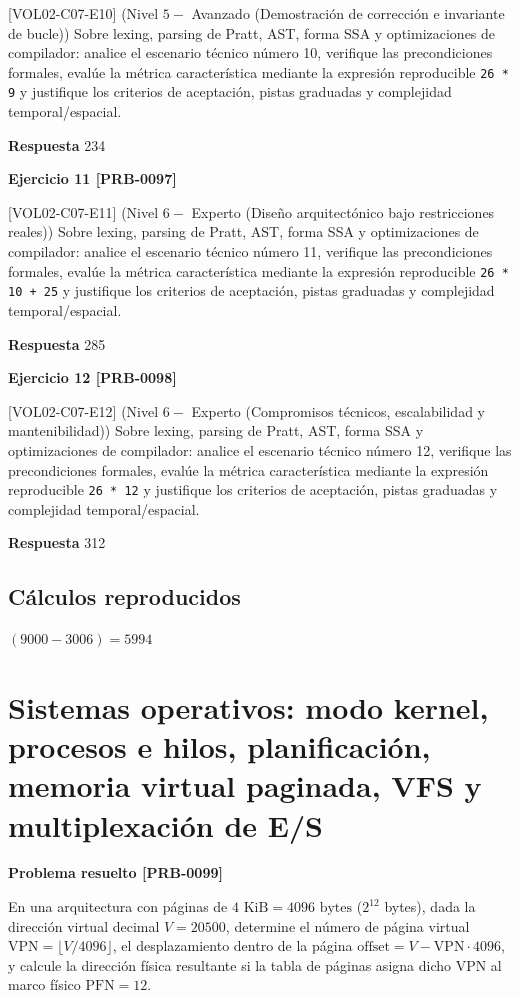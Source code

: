 \documentclass{book}
\begin{document}
[VOL02-C07-E10] (Nivel \(5 -\) Avanzado (Demostración de corrección e invariante de bucle)) Sobre lexing, parsing de Pratt, AST, forma SSA y optimizaciones de compilador: analice el escenario técnico número 10, verifique las precondiciones formales, evalúe la métrica característica mediante la expresión reproducible \texttt{26 * 9} y justifique los criterios de aceptación, pistas graduadas y complejidad temporal/espacial.

\noindent\textbf{Respuesta} 234

\noindent\textbf{Ejercicio 11 [PRB-0097]}

[VOL02-C07-E11] (Nivel \(6 -\) Experto (Diseño arquitectónico bajo restricciones reales)) Sobre lexing, parsing de Pratt, AST, forma SSA y optimizaciones de compilador: analice el escenario técnico número 11, verifique las precondiciones formales, evalúe la métrica característica mediante la expresión reproducible \texttt{26 * 10 + 25} y justifique los criterios de aceptación, pistas graduadas y complejidad temporal/espacial.

\noindent\textbf{Respuesta} 285

\noindent\textbf{Ejercicio 12 [PRB-0098]}

[VOL02-C07-E12] (Nivel \(6 -\) Experto (Compromisos técnicos, escalabilidad y mantenibilidad)) Sobre lexing, parsing de Pratt, AST, forma SSA y optimizaciones de compilador: analice el escenario técnico número 12, verifique las precondiciones formales, evalúe la métrica característica mediante la expresión reproducible \texttt{26 * 12} y justifique los criterios de aceptación, pistas graduadas y complejidad temporal/espacial.

\noindent\textbf{Respuesta} 312

\subsection*{Cálculos reproducidos}

\(\left(9000-3006\right) = 5994\)

\section{Sistemas operativos: modo kernel, procesos e hilos, planificación, memoria virtual paginada, VFS y multiplexación de E/S}

\noindent\textbf{Problema resuelto [PRB-0099]}

En una arquitectura con páginas de \(4\text{ KiB} = 4096\text{ bytes}\) (\(2^{12}\) bytes), dada la dirección virtual decimal \(V = 20500\), determine el número de página virtual \(\text{VPN} = \lfloor V / 4096 \rfloor\), el desplazamiento dentro de la página \(\text{offset} = V - \text{VPN} \cdot 4096\), y calcule la dirección física resultante si la tabla de páginas asigna dicho VPN al marco físico \(\text{PFN} = 12\).
\end{document}
